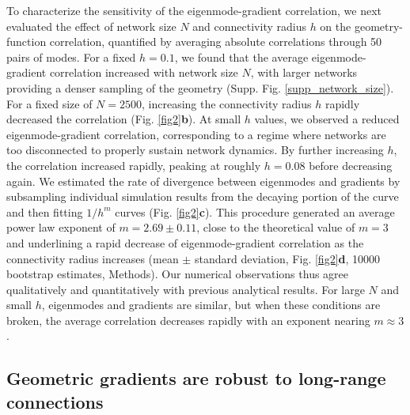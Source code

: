 \documentclass{article}
\begin{document}
To characterize the sensitivity of the eigenmode-gradient correlation, we next evaluated the effect of network size $N$ and connectivity radius $h$ on the geometry-function correlation, quantified by averaging absolute correlations through 50 pairs of modes. For a fixed $h=0.1$, we found that the average eigenmode-gradient correlation increased with network size $N$, with larger networks providing a denser sampling of the geometry (Supp. Fig. \ref{supp_network_size}). For a fixed size of $N=2500$, increasing the connectivity radius $h$ rapidly decreased the correlation (Fig. \ref{fig2}\textbf{b}). At small $h$ values, we observed a reduced eigenmode-gradient correlation, corresponding to a regime where networks are too disconnected to properly sustain network dynamics. By further increasing $h$, the correlation increased rapidly, peaking at roughly $h=0.08$ before decreasing again. We estimated the rate of divergence between eigenmodes and gradients by subsampling individual simulation results from the decaying portion of the curve and then fitting $1/h^m$ curves (Fig. \ref{fig2}\textbf{c}). This procedure generated an average power law exponent of $m=2.69\pm0.11$, close to the theoretical value of $m=3$ and underlining a rapid decrease of eigenmode-gradient correlation as the connectivity radius increases (mean $\pm$ standard deviation, Fig. \ref{fig2}\textbf{d}, 10000 bootstrap estimates, Methods). Our numerical observations thus agree qualitatively and quantitatively with previous analytical results\cite{GarcaTrillos2019}. For large $N$ and small $h$, eigenmodes and gradients are similar, but when these conditions are broken, the average correlation decreases rapidly with an exponent nearing $m\approx3$.

\subsection*{Geometric gradients are robust to long-range connections}
\end{document}
